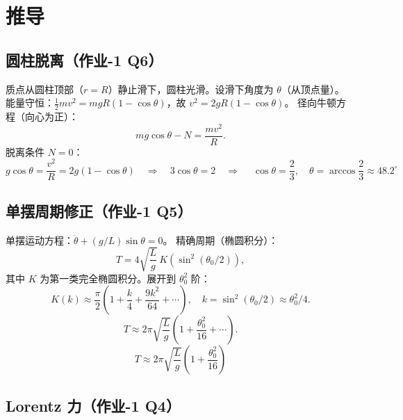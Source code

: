 \documentclass[UTF8,a4paper,11pt]{ctexart}
\begin{document}
\section{推导}
\label{sec:derive}

\subsection{圆柱脱离（作业-1 Q6）}
\label{sub:cylinder}

质点从圆柱顶部（$r=R$）静止滑下，圆柱光滑。设滑下角度为 $\theta$（从顶点量）。
能量守恒：$\frac12 mv^2=mgR(1-\cos\theta)$，故 $v^2=2gR(1-\cos\theta)$。
径向牛顿方程（向心为正）：
\begin{equation}
  mg\cos\theta - N = \frac{mv^2}{R}.
\end{equation}
脱离条件 $N=0$：
\begin{equation}
  g\cos\theta = \frac{v^2}{R} = 2g(1-\cos\theta)
  \quad\Longrightarrow\quad
  3\cos\theta=2
  \quad\Longrightarrow\quad
  \boxed{\;\cos\theta=\frac23,\quad \theta=\arccos\frac23\approx48.2^\circ\;}
\end{equation}

\subsection{单摆周期修正（作业-1 Q5）}
\label{sub:pendulum}

单摆运动方程：$\ddot\theta+(g/L)\sin\theta=0$。
精确周期（椭圆积分）：
\begin{equation}
  T=4\sqrt{\frac{L}{g}}\,K(\sin^2(\theta_0/2)),
\end{equation}
其中 $K$ 为第一类完全椭圆积分。展开到 $\theta_0^2$ 阶：
\begin{equation}
  K(k)\approx \frac{\pi}{2}\left(1+\frac{k}{4}+\frac{9k^2}{64}+\cdots\right),
  \quad k=\sin^2(\theta_0/2)\approx \theta_0^2/4.
\end{equation}
\begin{equation}
  T\approx 2\pi\sqrt{\frac{L}{g}}\left(1+\frac{\theta_0^2}{16}+\cdots\right).
\end{equation}
\begin{equation}
  \boxed{\;T\approx 2\pi\sqrt{\frac{L}{g}}\left(1+\frac{\theta_0^2}{16}\right)\;}
\end{equation}

\subsection{Lorentz 力（作业-1 Q4）}
\label{sub:lorentz}
\end{document}
